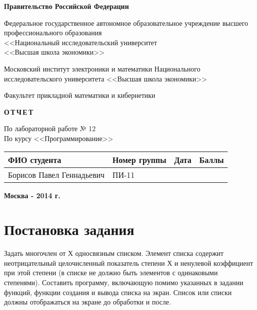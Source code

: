 \documentclass[a4paper,12pt,fleqn,twoside]{scrartcl}
\begin{document}
\begin{center}

\large
\bfseries
Правительство Российской Федерации
\bigskip


Федеральное государственное автономное образовательное учреждение высшего профессионального образования\\
<<Национальный исследовательский университет\\
<<Высшая школа экономики>>\\
\bigskip
\mdseries

Московский институт электроники и математики Национального исследовательского университета <<Высшая школа экономики>>
\vspace{4ex}

Факультет прикладной математики и кибернетики
\vfill

\bfseries
\sffamily
О\,Т\,Ч\,Е\,Т\,\\
\bigskip

По лабораторной работе № 12\\
\bigskip
По курсу <<Программирование>>
\rmfamily \mdseries

\vfill

\small
\extrarowheight=3pt
\begin{tabular}{|l|l|l|l|}
\hline
ФИО студента & Номер группы & Дата & Баллы \\\hline
\multirow{4}{*}{Борисов Павел Геннадьевич} & \multirow{4}{*}{ПИ-11} & \phantom{22.22.2222} & \phantom{10} \\\cline{3-4}
&&&\\\cline{3-4}
&&&\\\cline{3-4}
&&&\\\hline

\end{tabular}
\vfill


\bfseries \normalsize Москва - 2014 г.

\end{center}

\newpage
\section*{Постановка задания}
Задать многочлен от Х односвязным списком. Элемент списка содержит неотрицательный целочисленный показатель степени Х и ненулевой коэффициент при этой степени (в списке не должно быть элементов с одинаковыми степенями). Составить программу, включающую помимо указанных в задании функций, функции создания и вывода списка на экран. Список или списки должны отображаться на экране до обработки и после.
\end{document}
